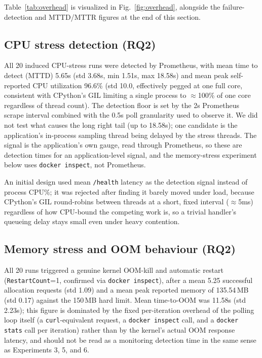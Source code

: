 \documentclass[conference]{IEEEtran}
\begin{document}
Table~\ref{tab:overhead} is visualized in Fig.~\ref{fig:overhead}, alongside
the failure-detection and MTTD/MTTR figures at the end of this section.

\subsection{CPU stress detection (RQ2)}
All 20 induced CPU-stress runs were detected by Prometheus, with mean time
to detect (MTTD) 5.65s (std 3.68s, min 1.51s, max 18.58s) and mean peak
self-reported CPU utilization 96.6\% (std 10.0, effectively pegged at one
full core, consistent with CPython's GIL limiting a single process to
$\approx$100\% of one core regardless of thread count). The detection floor
is set by the 2s Prometheus scrape interval combined with the 0.5s poll
granularity used to observe it. We did not test what causes the long right tail (up
to 18.58s); one candidate is the application's in-process sampling thread being
delayed by the stress threads. The signal is the application's own gauge, read through
Prometheus, so these are detection times for an application-level signal, and the
memory-stress experiment below uses \texttt{docker inspect}, not Prometheus.

An initial design used mean \texttt{/health} latency as the detection
signal instead of process CPU\%; it was rejected after finding it barely
moved under load, because CPython's GIL round-robins between threads at a
short, fixed interval ($\approx$5ms) regardless of how CPU-bound the
competing work is, so a trivial handler's queueing delay stays small even
under heavy contention.

\subsection{Memory stress and OOM behaviour (RQ2)}
All 20 runs triggered a genuine kernel OOM-kill and automatic restart
(\texttt{RestartCount}=1, confirmed via \texttt{docker inspect}), after a
mean 5.25 successful allocation requests (std 1.09) and a mean peak reported
memory of 135.54\,MB (std 0.17) against the 150\,MB hard limit. Mean
time-to-OOM was 11.58s (std 2.23s); this figure is dominated by the fixed
per-iteration overhead of the polling loop itself (a \texttt{curl}-equivalent
request, a \texttt{docker inspect} call, and a \texttt{docker stats} call
per iteration) rather than by the kernel's actual OOM response latency, and
should not be read as a monitoring detection time in the same sense as
Experiments 3, 5, and 6.
\end{document}
